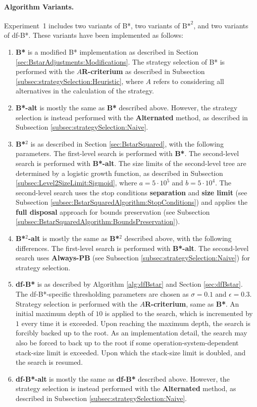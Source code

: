 \paragraph{Algorithm Variants.}
\label{subsec:Exp1:Algorithms}
Experiment\ 1 includes two variants of B*, two variants of ${\text{B*}}^2$, and two variants of df-B*. These variants have been implemented as follows:
\begin{enumerate}
    \item \textbf{B*} is a modified B* \cite{Berliner1979} implementation as described in Section \ref{sec:BstarAdjustments:Modifications}. The strategy selection of B* is performed with the $A$\textbf{R-criterium} as described in Subsection \ref{subsec:strategySelection:Heuristic}, where $A$ refers to considering all alternatives in the calculation of the strategy.
%
    \item \textbf{B*-alt} is mostly the same as \textbf{B*} described above. However, the strategy selection is instead performed with the \textbf{Alternated} method, as described in Subsection \ref{subsec:strategySelection:Naive}.
%
    \item \textbf{B*}$^2$ is as described in Section \ref{sec:BstarSquared}, with the following parameters. The first-level search is performed with \textbf{B*}. The second-level search is performed with \textbf{B*-alt}. The size limits of the second-level tree are determined by a logistic growth function, as described in Subsection \ref{subsec:Level2SizeLimit:Sigmoid}, where $a=5\cdot10^5$ and $b=5\cdot10^4$. The second-level search uses the stop conditions \textbf{separation} and \textbf{size limit} (see Subsection \ref{subsec:BstarSquaredAlgorithm:StopConditions}) and applies the \textbf{full disposal} approach for bounds preservation (see Subsection \ref{subsec:BstarSquaredAlgorithm:BoundsPreservation}).
%
    \item \textbf{B*}$^2$\textbf{-alt} is mostly the same as \textbf{B*}$^2$ described above, with the following differences. The first-level search is performed with \textbf{B*-alt}. The second-level search uses \textbf{Always-PB} (see Subsection \ref{subsec:strategySelection:Naive}) for strategy selection.
%
    \item \textbf{df-B*} is as described by Algorithm \ref{alg:dfBstar} and Section \ref{sec:dfBstar}. The df-B*-specific thresholding parameters are chosen as $\sigma=0.1$ and $\epsilon=0.3$. Strategy selection is performed with the $A$\textbf{R-criterium}, same as \textbf{B*}. An initial maximum depth of $10$ is applied to the search, which is incremented by $1$ every time it is exceeded. Upon reaching the maximum depth, the search is forcibly backed up to the root. As an implementation detail, the search may also be forced to back up to the root if some operation-system-dependent stack-size limit is exceeded. Upon which the stack-size limit is doubled, and the search is resumed.
%
    \item \textbf{df-B*-alt} is mostly the same as \textbf{df-B*} described above. However, the strategy selection is instead performed with the \textbf{Alternated} method, as described in Subsection \ref{subsec:strategySelection:Naive}.
%
\end{enumerate}

